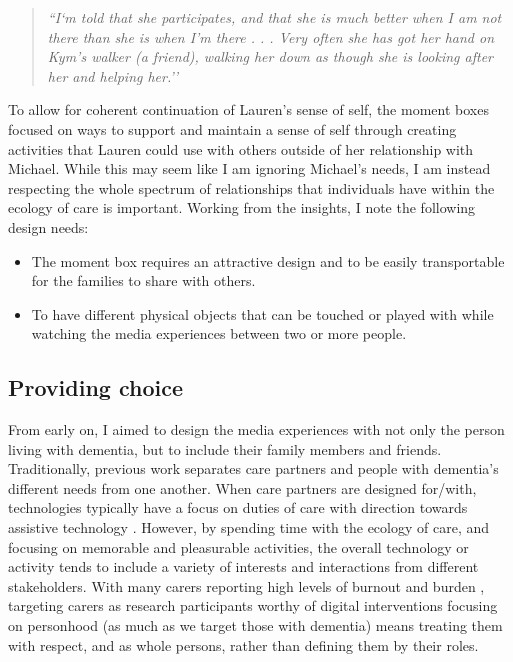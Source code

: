 \begin{quote}
\textit{    ``I`m told that she participates, and that she is much better when I am not there than she is when I’m there . . . Very often she has got her hand on Kym’s walker (a friend), walking her down as though she is looking after her and helping her.''
}
\end{quote}

To allow for coherent continuation of Lauren’s sense of self, the moment boxes focused on ways to support and maintain a sense of self through creating activities that Lauren could use with others outside of her relationship with Michael. While this may seem like I am ignoring Michael’s needs, I am instead respecting the whole spectrum of relationships that individuals have within the ecology of care is important. Working from the insights, I note the following design needs:
\begin{itemize}
    \item The moment box requires an attractive design and to be easily transportable for the families to share with others.
    \item To have different physical objects that can be touched or played with while watching the media experiences between two or more people. 
\end{itemize}

\subsection{Providing choice}
\label{DR:ProvidingChoice}
From early on, I aimed to design the media experiences with not only the person living with dementia, but to include their family members and friends. Traditionally, previous work separates care partners and people with dementia's different needs from one another. When care partners are designed for/with, technologies typically have a focus on duties of care with direction towards assistive technology \citep{bennett_assistive_2017,bharucha2009intelligent,gibson2015everyday}. However, by spending time with the ecology of care, and focusing on memorable and pleasurable activities, the overall technology or activity tends to include a variety of interests and interactions from different stakeholders. With many carers reporting high levels of burnout and burden \citep{takai_experience_2009}, targeting carers as research participants worthy of digital interventions focusing on personhood (as much as we target those with dementia) means treating them with respect, and as whole persons, rather than defining them by their roles.

